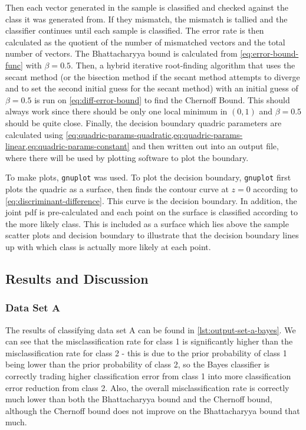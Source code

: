 \documentclass[headings=optiontoheadandtoc,listof=totoc,parskip=full]{scrartcl}
\begin{document}
Then each vector generated in the sample is classified and checked against the class it was generated from. If they mismatch, the mismatch is tallied and the classifier continues until each sample is classified. The error rate is then calculated as the quotient of the number of mismatched vectors and the total number of vectors. The Bhattacharyya bound is calculated from \cref{eq:error-bound-func} with $\beta = 0.5$. Then, a hybrid iterative root-finding algorithm that uses the secant method (or the bisection method if the secant method attempts to diverge and to set the second initial guess for the secant method) with an initial guess of $\beta = 0.5$ is run on \cref{eq:diff-error-bound} to find the Chernoff Bound. This should always work since there should be only one local minimum in $(0,1)$ and $\beta = 0.5$ should be quite close. Finally, the decision boundary quadric parameters are calculated using \cref{eq:quadric-params-quadratic,eq:quadric-params-linear,eq:quadric-params-constant} and then written out into an output file, where there will be used by plotting software to plot the boundary.

To make plots, \texttt{gnuplot} was used. To plot the decision boundary, \texttt{gnuplot} first plots the quadric as a surface, then finds the contour curve at $z = 0$ according to \cref{eq:discriminant-difference}. This curve is the decision boundary. In addition, the joint pdf is pre-calculated and each point on the surface is classified according to the more likely class. This is included as a surface which lies above the sample scatter plots and decision boundary to illustrate that the decision boundary lines up with which class is actually more likely at each point.

\subsection{Results and Discussion}

\subsubsection{Data Set A}
\label{sec:results-bayes-a}

The results of classifying data set A can be found in \cref{lst:output-set-a-bayes}. We can see that the misclassification rate for class 1 is significantly higher than the misclassification rate for class 2 - this is due to the prior probability of class 1 being lower than the prior probability of class 2, so the Bayes classifier is correctly trading higher classification error from class 1 into more classification error reduction from class 2. Also, the overall misclassification rate is correctly much lower than both the Bhattacharyya bound and the Chernoff bound, although the Chernoff bound does not improve on the Bhattacharyya bound that much.
\end{document}
